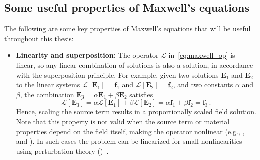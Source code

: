     \subsection*{Some useful properties of Maxwell's equations}
    The following are some key properties of Maxwell's equations that will be
    useful throughout this thesis:
    \begin{itemize}
        \item \textbf{Linearity and superposition:} The operator $\mathcal{L}$ in~\eqref{eq:maxwell_op} is linear, so any linear combination of solutions is
              also a solution, in accordance with the superposition principle.
              For example, given two solutions $\mathbf{E}_1$ and $\mathbf{E}_2$ to the
              linear systems $\mathcal{L}[\mathbf{E}_1] = \mathbf{f}_1$ and
              $\mathcal{L}[\mathbf{E}_2] = \mathbf{f}_2$,
              and two constants $\alpha$ and $\beta$, the combination $\mathbf{E}_3 =
                  \alpha \mathbf{E}_1 + \beta \mathbf{E}_2$ satisfies
              \begin{equation}
                  \mathcal{L}[\mathbf{E}_3] = \alpha \mathcal{L}[\mathbf{E}_1] + \beta
                  \mathcal{L}[\mathbf{E}_2] = \alpha \mathbf{f}_1 + \beta \mathbf{f}_2 =
                  \mathbf{f}_3\,.
              \end{equation}
              Hence, scaling the source term results in a proportionally scaled field
              solution. Note that this property is not valid when the source term or material
              properties depend on the field itself, making the operator nonlinear (e.g., ,
               and ). In such
              cases the problem can be linearized for small nonlinearities
              using perturbation theory ()~\cite{ownpub4}.


\end{itemize}
